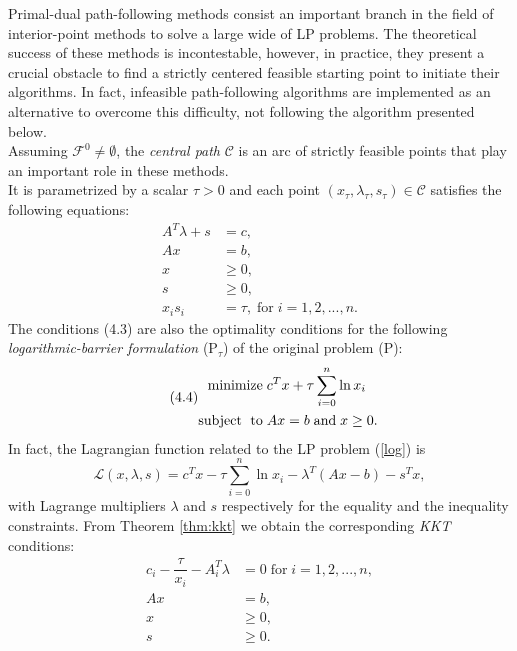\documentclass[a4paper,10 pt,titlepage,twoside]{report}
\theoremstyle{plain}
\theoremstyle{definition}
\theoremstyle{remark}
\begin{document}
Primal-dual path-following methods consist an
important branch in the field of interior-point methods to solve a large wide of LP problems.
The theoretical success of these methods is incontestable, however, in practice, they present a crucial obstacle
to find a strictly centered feasible starting point to initiate their algorithms. In fact, infeasible path-following algorithms are implemented as an alternative to overcome this difficulty, not following the algorithm presented below.\\ Assuming $\mathcal{F}^{0}\neq \emptyset $, the \textit{central path} $\mathcal{C}$ is an arc of strictly feasible points that play an important role in these methods. \\It is parametrized by a scalar $\tau  > 0$ and each point $(x_{\tau}, \lambda_{\tau}, s_{\tau})\in \mathcal{C}$ satisfies the following equations:
\begin{align}
A^{T}\lambda+s&=c,\tag{4.3a}\\
Ax&=b,\tag{4.3b}\\\label{KKT2}
x&\geq 0,\tag{4.3c}\\
s&\geq 0,\tag{4.3d}\\
x_{i}s_{i}&= \tau,\; \text{for}\;i= 1,2,...,n.\tag{4.3e}\label{(Tao)}
\end{align} 
The conditions (4.3) are also the optimality conditions for the following \textit{logarithmic-barrier formulation} (P$_{\tau}$) of the original problem (P):
\begin{equation}\label{log}\tag{4.4}
\begin{split}
\text{minimize\;} &c^{T}x + \tau\sum_{i=0}^{n}\ln{x_{i}}\\
\text{subject\; to\;}&Ax = b\;\text{and\;} x\geq0.
\end{split}
\end{equation}
In fact, the Lagrangian function related to the LP problem (\ref{log}) is
\begin{equation*}
\mathcal{L}(x,\lambda,s)=c^{T}x- \tau\sum_{i=0}^{n}\ln{x_{i}}-\lambda^{T}\left(Ax-b\right)-s^{T}x,
\end{equation*}
with Lagrange multipliers $\lambda$ and $s$ respectively for the equality and the inequality constraints. From Theorem \ref{thm:kkt} we obtain the corresponding \textit{KKT} conditions:
\begin{align*}
c_{i} - \dfrac{\tau}{x_{i}} - A^{T}_{i}\lambda&= 0\; \text{for}\;i = 1,2,...,n,\\
Ax&=b,\\
x&\geq 0,\\
s&\geq 0.\\
\end{align*}  
\end{document}
